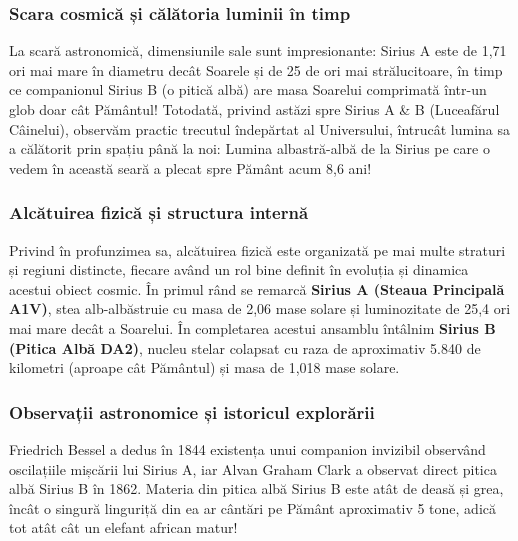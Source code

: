\subsubsection*{Scara cosmică și călătoria luminii în timp}
La scară astronomică, dimensiunile sale sunt impresionante: Sirius A este de 1,71 ori mai mare în diametru decât Soarele și de 25 de ori mai strălucitoare, în timp ce companionul Sirius B (o pitică albă) are masa Soarelui comprimată într-un glob doar cât Pământul! Totodată, privind astăzi spre Sirius A \& B (Luceafărul Câinelui), observăm practic trecutul îndepărtat al Universului, întrucât lumina sa a călătorit prin spațiu până la noi: Lumina albastră-albă de la Sirius pe care o vedem în această seară a plecat spre Pământ acum 8,6 ani!

\subsubsection*{Alcătuirea fizică și structura internă}
Privind în profunzimea sa, alcătuirea fizică este organizată pe mai multe straturi și regiuni distincte, fiecare având un rol bine definit în evoluția și dinamica acestui obiect cosmic. În primul rând se remarcă \textbf{Sirius A (Steaua Principală A1V)}, stea alb-albăstruie cu masa de 2,06 mase solare și luminozitate de 25,4 ori mai mare decât a Soarelui. În completarea acestui ansamblu întâlnim \textbf{Sirius B (Pitica Albă DA2)}, nucleu stelar colapsat cu raza de aproximativ 5.840 de kilometri (aproape cât Pământul) și masa de 1,018 mase solare.

\subsubsection*{Observații astronomice și istoricul explorării}
Friedrich Bessel a dedus în 1844 existența unui companion invizibil observând oscilațiile mișcării lui Sirius A, iar Alvan Graham Clark a observat direct pitica albă Sirius B în 1862. Materia din pitica albă Sirius B este atât de deasă și grea, încât o singură linguriță din ea ar cântări pe Pământ aproximativ 5 tone, adică tot atât cât un elefant african matur!

